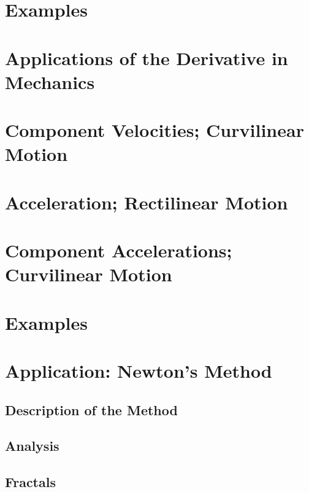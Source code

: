 \section{Examples}
\label{sec:06:11}

\section{Applications of the Derivative in Mechanics}
\label{sec:06:12}

\section{Component Velocities; Curvilinear Motion}
\label{sec:06:13}

\section{Acceleration; Rectilinear Motion}
\label{sec:06:14}

\section{Component Accelerations; Curvilinear Motion}
\label{sec:06:15}

\section{Examples}
\label{sec:06:16}

\section{Application: Newton's Method}
\label{sec:06:17}

\subsection{Description of the Method}
\label{subsec:06:17:01}

\subsection{Analysis}
\label{subsec:06:17:02}

\subsection{Fractals}
\label{subsec:06:17:03}
